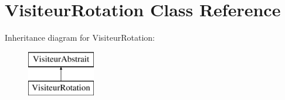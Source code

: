 \hypertarget{class_visiteur_rotation}{}\section{Visiteur\+Rotation Class Reference}
\label{class_visiteur_rotation}
Inheritance diagram for Visiteur\+Rotation\+:\begin{figure}[H]
\begin{center}
\leavevmode
\includegraphics[height=2.000000cm]{class_visiteur_rotation}
\end{center}
\end{figure}
